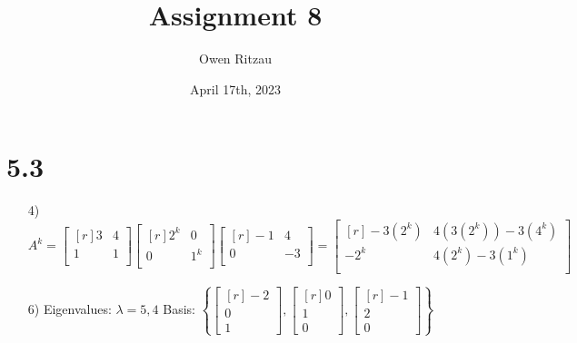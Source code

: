\documentclass{article}
\title{Assignment 8}
\author{Owen Ritzau}
\date{April 17th, 2023}
\begin{document}
\maketitle
\section * {5.3}
\begin{enumerate}
  \item[4)]
    $A^k = \begin{bmatrix*}[r]
      3 & 4 \\
      1 & 1 \\
    \end{bmatrix*} \begin{bmatrix*}[r]
      2^k & 0 \\
      0 & 1^k \\
    \end{bmatrix*} \begin{bmatrix*}[r]
      -1 & 4 \\
      0 & -3 \\
    \end{bmatrix*} = \begin{bmatrix*}[r]
      -3(2^k) & 4(3(2^k)) - 3(4^k) \\
      -2^k & 4(2^k) - 3(1^k) \\
    \end{bmatrix*}$

  \item[6)]
    Eigenvalues: $\lambda = 5, 4$ 
    Basis: $\left\{
      \begin{bmatrix*}[r]
      -2 \\ 0 \\ 1 \end{bmatrix*},
      \begin{bmatrix*}[r]
      0 \\ 1 \\ 0 \end{bmatrix*},
      \begin{bmatrix*}[r]
      -1 \\ 2 \\ 0 \end{bmatrix*}
    \right\}$


\end{enumerate}
\end{document}
